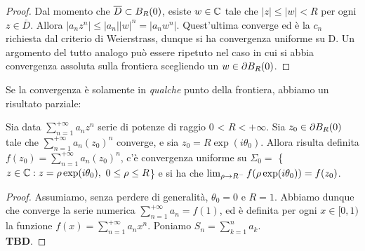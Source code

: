 \documentclass[Completo.tex]{subfiles}
\begin{document}
\begin{proof}
	Dal momento che $\overline{D} \subset B_R(0)$, esiste $w \in \bb[C]$ tale che $\vert z \vert \leq \vert w \vert < R$ per ogni $z \in \overline{D}$. Allora $\vert a_n z^n \vert \leq \vert a_n \vert \vert w \vert^n = \vert a_n w^n \vert$. Quest'ultima converge ed è la $c_n$ richiesta dal criterio di Weierstrass, dunque si ha convergenza uniforme su D. Un argomento del tutto analogo può essere ripetuto nel caso in cui si abbia convergenza assoluta sulla frontiera scegliendo un $w \in \partial B_R(0)$.
\end{proof}
Se la convergenza è solamente in \textit{qualche} punto della frontiera, abbiamo un risultato parziale:
\begin{eTh}[Abel]
	Sia data $\sum_{n=1}^{+\infty} a_n z^n$ serie di potenze di raggio 0 < $R < +\infty$. Sia $z_0 \in \partial B_R(0)$ tale che $\sum_{n=1}^{+\infty} a_n (z_0)^n$ converge, e sia $z_0 = R\exp(i\theta_0)$. Allora risulta definita $f(z_0) = \sum_{n=1}^{+\infty} a_n (z_0)^n$, c'è convergenza uniforme su $\Sigma_0 =$ \{$z \in \bb[C]: z = \rho\exp(i\theta_0), \ 0 \leq \rho \leq R$\} e si ha che $\lim_{\rho \rightarrow R^{-}} f(\rho\exp(i\theta_0)) = f(z_0)$.
\end{eTh}
\begin{proof}
	Assumiamo, senza perdere di generalità, $\theta_0 = 0$ e $R = 1$. Abbiamo dunque che converge la serie numerica $\sum_{n=1}^{+\infty} a_n = f(1)$, ed è definita per ogni $x \in [0,1)$ la funzione $f(x) = \sum_{n=1}^{+\infty} a_n x^n$. Poniamo $S_n = \sum_{k=1}^{n} a_k$. \\
	\textbf{TBD}.
\end{proof}
\end{document}
